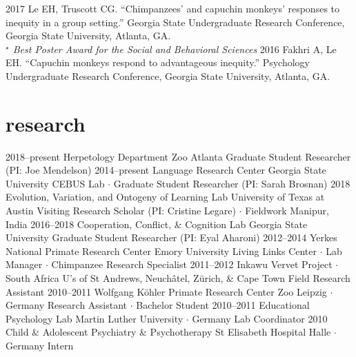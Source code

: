 \documentclass[]{friggeri-cv}
\begin{document}
\begin{entrylist2}
  \entrytwo
    {2017}
    {Le EH, Truscott CG. ``Chimpanzees' and capuchin monkeys' responses to inequity in a group setting.'' Georgia State Undergraduate Research Conference, Georgia State University, Atlanta, GA.\\
    \emph{${}^\star$ Best Poster Award for the Social and Behavioral Sciences}}
  \entrytwo
    {2016}
    {Fakhri A, Le EH. ``Capuchin monkeys respond to advantageous inequity.'' Psychology Undergraduate Research Conference, Georgia State University, Atlanta, GA.}
\end{entrylist2}


\section{research}

\begin{entrylist}
  \entry
    {2018--present}
    {Herpetology Department}
    {Zoo Atlanta}
    {Graduate Student Researcher (PI: Joe Mendelson)}
  \entry
    {2014--present}
    {Language Research Center}
    {Georgia State University}
    {CEBUS Lab $\cdot$ Graduate Student Researcher (PI: Sarah Brosnan)}
  \entry
    {2018}
    {Evolution, Variation, and Ontogeny of Learning Lab}
    {University of Texas at Austin}
    {Visiting Research Scholar (PI: Cristine Legare) $\cdot$ Fieldwork Manipur, India}
  \entry
    {2016--2018}
    {Cooperation, Conflict, \& Cognition Lab}
    {Georgia State University}
    {Graduate Student Researcher (PI: Eyal Aharoni)}
  \entry
    {2012--2014}
    {Yerkes National Primate Research Center}
    {Emory University}
    {Living Links Center $\cdot$ Lab Manager $\cdot$ Chimpanzee Research Specialist}
  \entry
    {2011--2012}
    {Inkawu Vervet Project $\cdot$ South Africa}
    {U's of St Andrews, Neuch\^{a}tel, Z\"urich, \& Cape Town}
    {Field Research Assistant}
  \entry
    {2010--2011}
    {Wolfgang K\"{o}hler Primate Research Center}
    {Zoo Leipzig $\cdot$ Germany}
    {Research Assistant $\cdot$ Bachelor Student}
  \entry
    {2010--2011}
    {Educational Psychology Lab}
    {Martin Luther University $\cdot$ Germany}
    {Lab Coordinator}
  \entry
    {2010}
    {Child \& Adolescent Psychiatry \& Psychotherapy}
    {St Elisabeth Hospital Halle $\cdot$ Germany}
    {Intern}
\end{entrylist}
\end{document}
